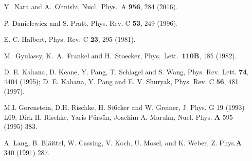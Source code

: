 \documentclass[]{article}
\begin{document}
\begin{thebibliography}{20}
  Y.~Nara and A.~Ohnishi,
  Nucl.\ Phys.\ A {\bf 956}, 284 (2016).

P. Danielewicz and S. Pratt, Phys. Rev. C {\bf 53}, 249 (1996).

E. C. Halbert, Phys. Rev. C {\bf 23}, 295 (1981).

  M.~Gyulassy, K.~A.~Frankel and H.~Stoecker,
  Phys.\ Lett.\  {\bf 110B}, 185 (1982).

D. E. Kahana, D. Keane, Y. Pang, T. Schlagel and S. Wang,
Phys. Rev. Lett. {\bf 74}, 4404 (1995);
D. E. Kahana, Y. Pang and E. V. Shuryak,
Phys. Rev. C {\bf 56}, 481 (1997).

M.I. Gorenstein, D.H. Rischke, H. St6cker and W. Greiner, 
 J. Phys. G 19 (1993) L69;
Dirk H. Rischke, Yaris P\"urs\"un, Joachim A. Maruhn, Nucl. Phys.
 {\bf A} 595 (1995) 383. 

A. Lang, B. Bl\"aittel, W. Cassing, V. Koch, U. Mosel, and K. Weber,
 Z. Phys.{\bf A} 340 (1991) 287.

\end{thebibliography}{}
\end{document}
